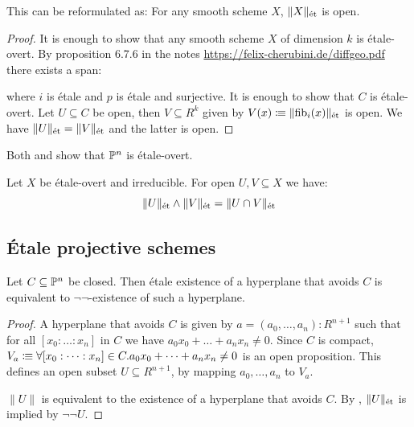 This can be reformulated as: For any smooth scheme $X$, $\|X\|_\et$ is open.

\begin{proof}
It is enough to show that any smooth scheme $X$ of dimension $k$ is étale-overt.
By proposition 6.7.6 in the notes \href{https://felix-cherubini.de/diffgeo.pdf}{https://felix-cherubini.de/diffgeo.pdf} there exists a span:
\begin{center}
\end{center}
where $i$ is étale and $p$ is étale and surjective.
It is enough to show that $C$ is étale-overt.
Let $U\subseteq C$ be open, then $V\subseteq R^k$
given by $V(x)\colonequiv \|\fib_i(x)\|_\et$ is open.
We have $\|U\|_\et=\|V\|_\et$ and the latter is open.
\end{proof}

\begin{remark}
  \label{Pn-etale-overt}
  Both  and  show that \(\bP^n\) is étale-overt.
\end{remark}

\begin{remark}
  \label{etale-overt-irreducible-open-intersection}
  Let \(X\) be étale-overt and irreducible.
  For open \(U,V\subseteq X\) we have:
  \[
    \|U\|_\et\wedge\|V\|_\et=\|U\cap V\|_\et
  \]
\end{remark}

\subsection{Étale projective schemes}

\begin{proposition}
  \label{notnot-hyperplane-equivalent-etale-exists}
  Let \(C\subseteq \bP^n\) be closed.
  Then étale existence of a hyperplane that avoids \(C\)
  is equivalent to \(\neg\neg\)-existence of such a hyperplane.
\end{proposition}

\begin{proof}
  A hyperplane that avoids \(C\) is given by \(a=(a_0,\dots,a_n):R^{n+1}\)
  such that for all \([x_0 : \dots : x_n]\) in \(C\) we have \(a_0x_0+\dots+a_nx_n\neq 0\).
  Since \(C\) is compact, \(V_a\colonequiv \forall [x_0 : \dots : x_n]\in C. a_0x_0+\dots+a_nx_n\neq 0\) is an open proposition. This defines an open subset \(U\subseteq R^{n+1}\), by mapping \(a_0,\dots,a_n\) to \(V_a\).

  \(\|U\|\) is equivalent to the existence of a hyperplane that avoids \(C\).
  By , \(\|U\|_\et\) is implied by \(\neg\neg U\).
\end{proof}

